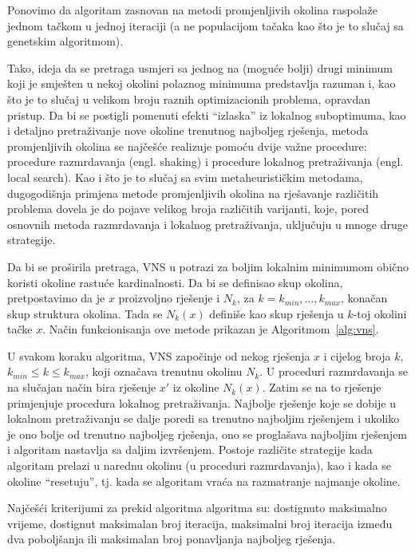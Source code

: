 \documentclass[a4paper, utf8, 11pt, colorlinks]{book}
\begin{document}
Ponovimo da algoritam zasnovan na metodi promjenljivih okolina raspolaže jednom tačkom u jednoj iteraciji (a ne populacijom tačaka kao što je to slučaj sa genetskim algoritmom).

Tako, ideja da se pretraga usmjeri sa jednog na (moguće bolji) drugi minimum koji je smješten u nekoj okolini polaznog minimuma predstavlja razuman  i, kao što je to slučaj u velikom broju raznih optimizacionih problema, opravdan pristup.
Da bi se postigli pomenuti efekti ``izlaska'' iz lokalnog suboptimuma, kao i detaljno pretraživanje nove okoline trenutnog najboljeg rješenja, metoda promjenljivih okolina se najčešće realizuje pomoću dvije važne procedure: procedure razmrdavanja (engl. shaking) i procedure lokalnog pretraživanja (engl. local search). Kao i što je to slučaj sa svim metaheurističkim metodama, dugogodišnja primjena metode promjenljivih okolina na rješavanje različitih problema dovela je do pojave velikog broja različitih varijanti, koje, pored osnovnih metoda razmrdavanja i lokalnog pretraživanja, uključuju u mnoge druge strategije.

Da bi se proširila pretraga,  VNS u potrazi za boljim lokalnim minimumom obično koristi okoline rastuće kardinalnosti. Da bi se definisao skup okolina, pretpostavimo da je $x$ proizvoljno rješenje i $N_k$, za $k=k_{min},\ldots,k_{max}$, konačan skup struktura okolina. Tada se  $N_k(x)$ definiše kao skup rješenja u $k$-toj okolini tačke $x$. 
Način funkcionisanja ove metode prikazan je Algoritmom~\ref{alg:vns}. 


U svakom koraku algoritma, VNS započinje od nekog rješenja $x$ i cijelog broja $k$, $k_{min}\leqslant k\leqslant k_{max}$, koji označava trenutnu okolinu $N_k$. U proceduri razmrdavanja
se na slučajan način bira rješenje  $x'$ iz okoline  $N_k(x)$. Zatim se na to rješenje primjenjuje procedura lokalnog pretraživanja. Najbolje rješenje koje se dobije u lokalnom pretraživanju se dalje poredi sa trenutno najboljim rješenjem i ukoliko je ono bolje od trenutno najboljeg rješenja, ono se proglašava najboljim rješenjem i algoritam nastavlja sa daljim izvršenjem. Postoje različite strategije kada algoritam prelazi u narednu okolinu (u proceduri razmrdavanja), kao i kada se okoline ``resetuju'', tj. kada se algoritam vraća na razmatranje najmanje okoline. 

Najčešći kriterijumi za prekid algoritma algoritma su: dostignuto maksimalno  vrijeme, dostignut maksimalan broj iteracija, maksimalni broj iteracija između dva poboljšanja ili maksimalan broj ponavljanja najboljeg rješenja.
\end{document}
